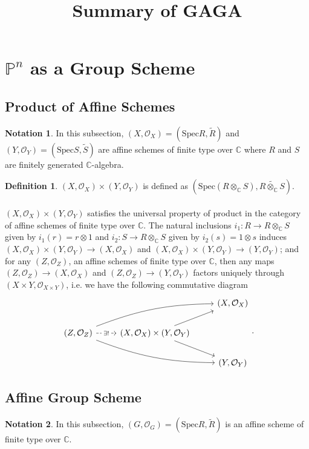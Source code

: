\documentclass{article}
\title{Summary of GAGA}
\date{}
\theoremstyle{definition}
\newtheorem{definition}{Definition}
\newtheorem*{notation}{Notation}
\newcommand{\Spec}{\mathrm{Spec}}
\newcommand{\ssheaf}[1]{\widetilde{#1}}
\newcommand{\tensorC}[2]{#1\otimes_\mathbb C #2}
\newcommand{\tensor}[2]{#1\otimes#2}
\newcommand{\so}[1]{(#1, \mathcal O_{#1})}
\newcommand{\sr}[1]{(\Spec{#1},\ssheaf{#1})}
\begin{document}
\maketitle

\section{$\mathbb P^n$ as a Group Scheme}

\subsection{Product of Affine Schemes}

\begin{notation}
In this subsection, $(X, \mathcal O_X)=(\Spec R,\ssheaf R)$ and $(Y,\mathcal O_Y)=(\Spec S, \ssheaf S)$ are affine schemes of finite type over $\mathbb C$ where $R$ and $S$ are finitely generated $\mathbb C$-algebra.
\end{notation}

\begin{definition}
	$\so X\times \so Y$ is defined as $(\Spec(\tensorC R S),\ssheaf{\tensorC R S})$.
\end{definition}

\paragraph{} $\so X\times \so Y$ satisfies the universal property of product in the category of affine schemes of finite type over $\mathbb C$. The natural inclusions $i_1:R\to \tensorC R S$ given by $i_1(r)=\tensor r 1$ and $i_2:S\to \tensorC R S$ given by $i_2(s)=\tensor 1 s$ induces $\so{X}\times\so Y\to \so X$ and $\so{X}\times\so Y\to \so Y$; and for any $\so Z$, an affine schemes of finite type over $\mathbb C$, then any maps $\so Z \to \so X$ and $\so Z\to\so Y$ factors uniquely through $\so{X\times Y}$, i.e. we have the following commutative diagram
\[
\begin{tikzcd}
 & & \so X\\
\so Z \arrow[rru, bend left=10] \arrow[rrd, bend right=10] \arrow[r, dashed, "\exists!" description] & \so{X}\times\so Y \arrow[ru] \arrow[rd]\\
 & & \so Y
\end{tikzcd}.
\]

\subsection{Affine Group Scheme}
\begin{notation}
In this subsection, $\so G=\sr R$ is an affine scheme of finite type over $\mathbb C$.	
\end{notation}
\end{document}
